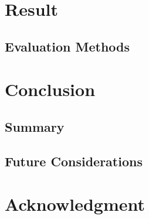 \documentclass{ieeeojies}
\begin{document}
\section{Result}

\subsection{Evaluation Methods}

\section{Conclusion}

\subsection{Summary}

\subsection{Future Considerations}

\section*{Acknowledgment}
\end{document}
